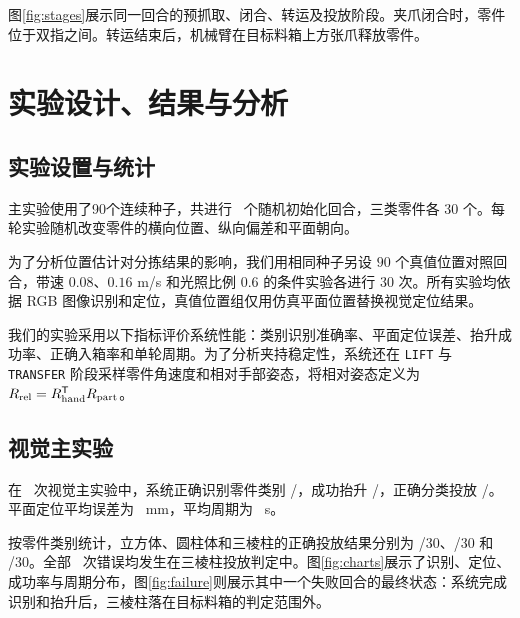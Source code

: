 \documentclass[UTF8,a4paper,11pt,fontset=windows]{ctexart}
\begin{document}
图\ref{fig:stages}展示同一回合的预抓取、闭合、转运及投放阶段。夹爪闭合时，零件位于双指之间。转运结束后，机械臂在目标料箱上方张爪释放零件。
\enlargethispage{2\baselineskip}

\section{实验设计、结果与分析}\label{sec:experiment}
\subsection{实验设置与统计}
主实验使用了90个连续种子，共进行 \MainEpisodes\ 个随机初始化回合，三类零件各 $30$ 个。每轮实验随机改变零件的横向位置、纵向偏差和平面朝向。

为了分析位置估计对分拣结果的影响，我们用相同种子另设 $90$ 个真值位置对照回合，带速 $0.08$、$0.16$ m/s 和光照比例 $0.6$ 的条件实验各进行 $30$ 次。所有实验均依据 RGB 图像识别和定位，真值位置组仅用仿真平面位置替换视觉定位结果。

我们的实验采用以下指标评价系统性能：类别识别准确率、平面定位误差、抬升成功率、正确入箱率和单轮周期。为了分析夹持稳定性，系统还在 \texttt{LIFT} 与 \texttt{TRANSFER} 阶段采样零件角速度和相对手部姿态，将相对姿态定义为 $R_{\rm rel}=R_{\rm hand}^{\mathsf T}R_{\rm part}$。

\subsection{视觉主实验}
在 \MainEpisodes\ 次视觉主实验中，系统正确识别零件类别 \MainEpisodes/\MainEpisodes，成功抬升 \MainEpisodes/\MainEpisodes，正确分类投放 \MainCorrectCount/\MainEpisodes。平面定位平均误差为 \MainPositionMm\ mm，平均周期为 \MainCycleSec\ s。

按零件类别统计，立方体、圆柱体和三棱柱的正确投放结果分别为 \MainCubeCorrect/30、\MainCylinderCorrect/30 和 \MainPrismCorrect/30。全部 \MainFailureCount\ 次错误均发生在三棱柱投放判定中。图\ref{fig:charts}展示了识别、定位、成功率与周期分布，图\ref{fig:failure}则展示其中一个失败回合的最终状态：系统完成识别和抬升后，三棱柱落在目标料箱的判定范围外。
\end{document}
